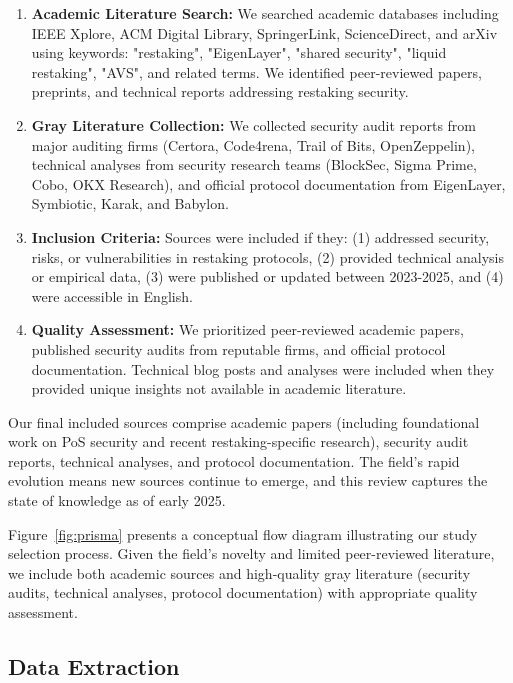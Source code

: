 \documentclass[runningheads]{llncs}
\begin{document}
\begin{enumerate}
    \item \textbf{Academic Literature Search:} We searched academic databases including IEEE Xplore, ACM Digital Library, SpringerLink, ScienceDirect, and arXiv using keywords: "restaking", "EigenLayer", "shared security", "liquid restaking", "AVS", and related terms. We identified peer-reviewed papers, preprints, and technical reports addressing restaking security.
    
    \item \textbf{Gray Literature Collection:} We collected security audit reports from major auditing firms (Certora, Code4rena, Trail of Bits, OpenZeppelin), technical analyses from security research teams (BlockSec, Sigma Prime, Cobo, OKX Research), and official protocol documentation from EigenLayer, Symbiotic, Karak, and Babylon.
    
    \item \textbf{Inclusion Criteria:} Sources were included if they: (1) addressed security, risks, or vulnerabilities in restaking protocols, (2) provided technical analysis or empirical data, (3) were published or updated between 2023-2025, and (4) were accessible in English.
    
    \item \textbf{Quality Assessment:} We prioritized peer-reviewed academic papers, published security audits from reputable firms, and official protocol documentation. Technical blog posts and analyses were included when they provided unique insights not available in academic literature.
\end{enumerate}

Our final included sources comprise academic papers (including foundational work on PoS security and recent restaking-specific research), security audit reports, technical analyses, and protocol documentation. The field's rapid evolution means new sources continue to emerge, and this review captures the state of knowledge as of early 2025.

Figure~\ref{fig:prisma} presents a conceptual flow diagram illustrating our study selection process. Given the field's novelty and limited peer-reviewed literature, we include both academic sources and high-quality gray literature (security audits, technical analyses, protocol documentation) with appropriate quality assessment.

\subsection{Data Extraction}
\end{document}
